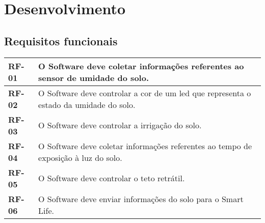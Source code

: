 \chapter{Desenvolvimento}
    \section{Requisitos funcionais}
        \begin{table}[!htbp]
            \centering
            \renewcommand{\arraystretch}{1.3}
            \label{tab:quadro_requisitos}
            \begin{tabular}{| L{3cm} | L{11cm} | }
                \hline
                \textbf{RF-01} & O Software deve coletar informações referentes ao sensor de umidade do solo.\\
                \hline

                \hline
                \textbf{RF-02} & O Software deve controlar a cor de um led que representa o estado da umidade do solo.\\
                \hline                   

                \hline
                \textbf{RF-03} & O Software deve controlar a irrigação do solo.\\
                \hline

                \hline
                \textbf{RF-04} & O Software deve coletar informações referentes ao tempo de exposição à luz do solo.\\
                \hline

                \hline
                \textbf{RF-05} & O Software deve controlar o teto retrátil.\\
                \hline

                \hline
                \textbf{RF-06} & O Software deve enviar informações do solo para o Smart Life.\\
                \hline

            \end{tabular}
            \vspace{2mm}
        \end{table}

